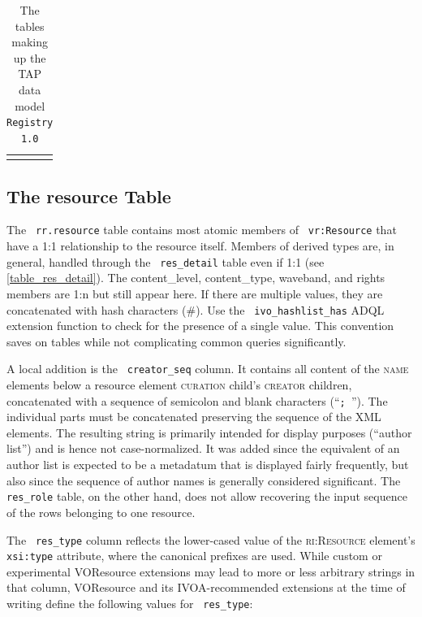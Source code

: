 \documentclass[11pt,a4paper]{ivoa}
\newcommand{\rtent}[1]{\texttt{\color{rtcolor} #1}}
\newcommand{\vorent}[1]{\textsc{#1}}
\begin{document}
\begin{table}[t]
{\begin{tabular}{p{}p{}}
\noalign{\vspace{2pt}}
\hline
\end{tabular}\hss}
\caption{The tables making up the TAP data model \texttt{Registry 1.0}}
\label{table:dm}
\end{table}



\subsection{The resource Table}

\label{table_resource}

The \rtent{rr.resource} table contains most atomic members of
\rtent{vr:Resource} that have a 1:1 relationship to the resource
itself.  Members of derived types are, in general, handled through 
the \rtent{res\_detail}
table even if 1:1 (see \ref{table_res_detail}).  The
content\_level, content\_type, waveband, and rights members are 1:n but still appear
here.  If there are multiple values, they are concatenated with hash
characters (\#).  Use the \rtent{ivo\_hashlist\_has} ADQL extension
function to check for the presence of a single value.  This convention
saves on tables while not complicating common queries significantly.

A local addition is the \rtent{creator\_seq} column.  It contains
all content of the \vorent{name} elements below a resource element
\vorent{curation} child's \vorent{creator} children, concatenated with a
sequence of semicolon and blank characters (``\mbox{\texttt{; }}''). The
individual parts must be concatenated preserving the sequence of the XML
elements.  The resulting string is primarily intended for display
purposes (``author list'') and is hence not case-normalized.  It was
added since the equivalent of an author list is expected to be a
metadatum that is displayed fairly frequently, but also since the
sequence of author names is generally considered significant.  The
\rtent{res\_role} table, on the other hand, does not allow recovering
the input sequence of the rows belonging to one resource.

The \rtent{res\_type} column reflects the lower-cased value of
the \vorent{ri:Resource} element's \texttt{xsi:type} attribute,
where the canonical prefixes are used.  While custom or experimental
VOResource extensions may lead to more or less arbitrary strings in that
column, VOResource and its IVOA-recommended extensions at the time of
writing define the following values for \rtent{res\_type}:
\end{document}
